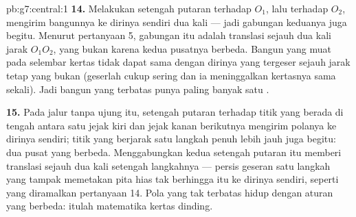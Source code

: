 \begin{solution}{pb:g7:central:1}
\textbf{14.} Melakukan setengah putaran terhadap $O_1$, lalu terhadap
$O_2$, mengirim bangunnya ke dirinya sendiri dua kali --- jadi
gabungan keduanya juga begitu. Menurut pertanyaan 5, gabungan itu
adalah translasi sejauh dua kali jarak $O_1 O_2$, yang bukan 
karena kedua pusatnya berbeda. Bangun yang muat pada selembar kertas
tidak dapat sama dengan dirinya yang tergeser sejauh jarak tetap yang
bukan  (geserlah cukup sering dan ia meninggalkan kertasnya sama
sekali). Jadi bangun yang terbatas punya paling banyak satu .

\textbf{15.} Pada jalur tanpa ujung itu, setengah putaran terhadap
titik yang berada di tengah antara satu jejak kiri dan jejak kanan
berikutnya mengirim polanya ke dirinya sendiri; titik yang berjarak
satu langkah penuh lebih jauh juga begitu: dua pusat yang berbeda.
Menggabungkan kedua setengah putaran itu memberi translasi sejauh dua
kali setengah langkahnya --- persis geseran satu langkah yang tampak
memetakan pita hias tak berhingga itu ke dirinya sendiri, seperti yang
diramalkan pertanyaan 14. Pola yang tak terbatas hidup dengan aturan
yang berbeda: itulah matematika kertas dinding.

\end{solution}
